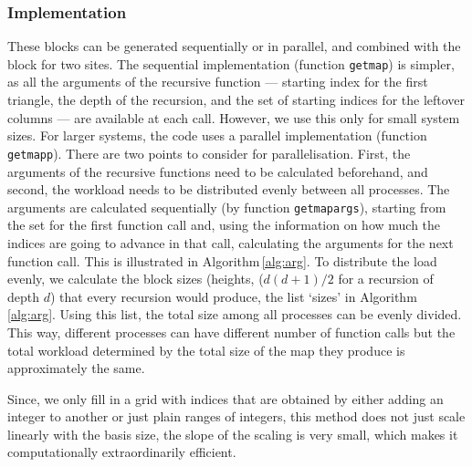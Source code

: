 \documentclass[final,twocolumn]{elsarticle}
\begin{document}
\begin{small}
\subsubsection{Implementation}
 These blocks can be generated sequentially or in parallel, and combined with the block for two sites.
 The sequential implementation (function \texttt{getmap}) is simpler, as all the arguments of the recursive function 
 ---
 starting index for the first triangle, the depth of the recursion, and 
 the set of starting indices for the leftover columns 
  --- are available at each call. 
 However, 
 we use this only for small system sizes. 
 For larger systems, the code uses a parallel implementation (function \texttt{getmapp}).
  There are two points to consider for parallelisation. 
  First, the arguments of the recursive functions need to be calculated beforehand, and second, the workload needs to be distributed evenly between all processes.
The arguments are calculated sequentially (by function \texttt{getmapargs}), starting from the set for the first function call and, 
using the information on how much the indices are going to advance in that call, calculating the arguments for the next function call. 
This is illustrated in Algorithm\,\ref{alg:arg}. 
To distribute the load evenly, 
we calculate the block sizes (heights, ($d(d+1)/2$ for a recursion of depth $d$) that every recursion would produce,
the list `sizes' in Algorithm\,\ref{alg:arg}.
Using this list, the total size among all processes can be evenly divided.
This way, different processes can have different number of function calls but the total workload determined by the total size of the map they produce is approximately the same.

 Since, we only fill in a grid with indices that are obtained by either adding an integer to another or just plain ranges of integers,
 this method does not just scale linearly with the basis size, the slope of the scaling is very small,
 which makes it computationally extraordinarily efficient.












\end{small}
\end{document}
